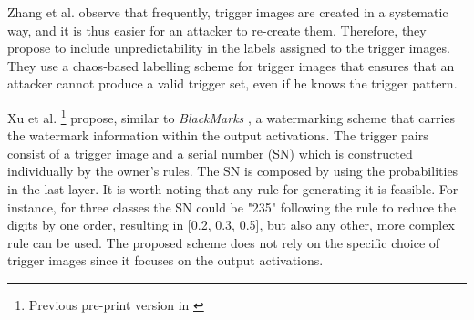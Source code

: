 Zhang et al. \cite{zhang_deeptrigger_2020} observe that frequently, trigger images are created in a systematic way, and it is thus easier for an attacker to re-create them.
Therefore, they propose to include unpredictability in the labels assigned to the trigger images. They use a chaos-based labelling scheme for trigger images that ensures that an attacker cannot produce a valid trigger set, even if he knows the trigger pattern.

Xu et al. \cite{xu_identity_2020}\footnote{Previous pre-print version in \cite{xu_novel_2019}} propose, similar to \textit{BlackMarks} \cite{chen_blackmarks_2019}, a watermarking scheme that carries the watermark information within the output activations. The trigger pairs consist of a trigger image and a serial number (SN) which is constructed individually by the owner's rules. The SN is composed by using the probabilities in the last layer.
It is worth noting that any rule for generating it is feasible. For instance, for three classes the SN could be "235" following the rule to reduce the digits by one order, resulting in [0.2, 0.3, 0.5], but also any other, more complex rule can be used. The proposed scheme does not rely on the specific choice of trigger images since it focuses on the output activations. 


